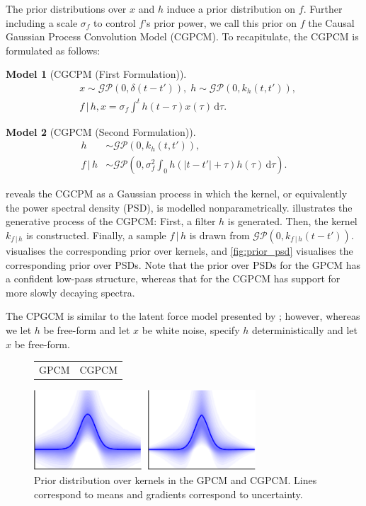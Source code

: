 \documentclass{article}
\newcommand{\id}[1]{\, \mathrm{d} #1}     %
\newcommand{\cond}{\, | \,}               %
\newtheorem{model}{Model}
\begin{document}
The prior distributions over $x$ and $h$ induce a prior distribution on $f$. Further including a scale $\sigma_f$ to control $f$'s prior power, we call this prior on $f$ the Causal Gaussian Process Convolution Model (CGPCM). To recapitulate, the CGPCM is formulated as follows:

\begin{model}[CGCPM (First Formulation)] \label{mod:cgpcm}
    \begin{align*}
        &x \sim \mathcal{GP}(0,\delta(t-t')), \;
        h \sim \mathcal{GP}(0, k_h(t,t')), \\
        &f\cond h, x = \sigma_f \int^t h(t- \tau)x(\tau)\id{\tau}.
    \end{align*}
\end{model}
\begin{model}[CGPCM (Second Formulation)] \label{mod:cgpcm2}
    \begin{align*}
        h &\sim \mathcal{GP}(0, k_h(t,t')), \\
        f \cond h &\sim \mathcal{GP}\left(0,  \sigma_f^2\int_0 h(|t-t'|+\tau)h(\tau)\id{\tau} \right).
    \end{align*}
\end{model}

 reveals the CGCPM as a Gaussian process in which the kernel, or equivalently the power spectral density (PSD), is modelled nonparametrically.  illustrates the generative process of the CGPCM: First, a filter $h$ is generated. Then, the kernel $k_{f\cond h}$ is constructed. Finally, a sample $f\cond h$ is drawn from $\mathcal{GP}(0,k_{f \cond h}(t-t'))$.  visualises the corresponding prior over kernels, and \cref{fig:prior_psd} visualises the corresponding prior over PSDs. Note that the prior over PSDs for the GPCM has a confident low-pass structure, whereas that for the CGPCM has support for more slowly decaying spectra.

The CPGCM is similar to the latent force model presented by \citet{Alvarez:2009:Latent_Force_Models}; however, whereas we let $h$ be free-form and let $x$ be white noise, \citet{Alvarez:2009:Latent_Force_Models} specify $h$ deterministically and let $x$ be free-form.

\begin{figure}[t]
    \centering
    \begin{tabularx}{\linewidth}{>{\centering}X>{\centering}X}
        GPCM & CGPCM
    \end{tabularx}
    \includegraphics[width=\linewidth, height=3cm]{resources/cropped/prior.pdf}
    \caption{Prior distribution over kernels in the GPCM and CGPCM. Lines correspond to means and gradients correspond to uncertainty.}
    \label{fig:prior}
\end{figure}
\end{document}
